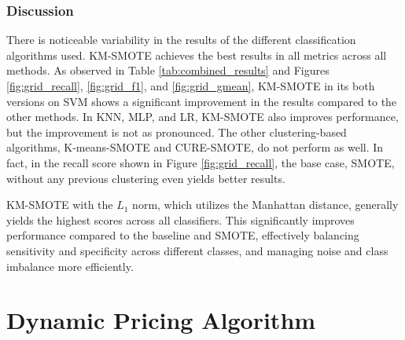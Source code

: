 \documentclass[12pt]{book}
\begin{document}
\subsection{Discussion} \label{sec:discussion}

There is noticeable variability in the results of the different classification algorithms used. KM-SMOTE achieves the best results in all metrics across all methods. As observed in Table \ref{tab:combined_results} and Figures \ref{fig:grid_recall}, \ref{fig:grid_f1}, and \ref{fig:grid_gmean}, KM-SMOTE in its both versions on SVM shows a significant improvement in the results compared to the other methods. In KNN, MLP, and LR, KM-SMOTE also improves performance, but the improvement is not as pronounced. The other clustering-based algorithms, K-means-SMOTE and CURE-SMOTE, do not perform as well. In fact, in the recall score shown in Figure \ref{fig:grid_recall}, the base case, SMOTE, without any previous clustering even yields better results.

KM-SMOTE with the $L_1$ norm, which utilizes the Manhattan distance, generally yields the highest scores across all classifiers. This significantly improves performance compared to the baseline and SMOTE, effectively balancing sensitivity and specificity across different classes, and managing noise and class imbalance more efficiently.









































\chapter{Dynamic Pricing Algorithm} \label{sec:dynamic}
\end{document}
